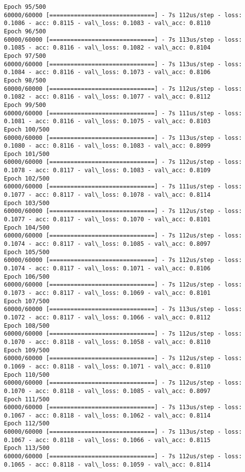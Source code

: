\documentclass[11pt]{article}
\begin{document}
\begin{Verbatim}[commandchars=\\\{\}]
Epoch 95/500
60000/60000 [==============================] - 7s 112us/step - loss: 0.1086 - acc: 0.8115 - val\_loss: 0.1083 - val\_acc: 0.8110
Epoch 96/500
60000/60000 [==============================] - 7s 113us/step - loss: 0.1085 - acc: 0.8116 - val\_loss: 0.1082 - val\_acc: 0.8104
Epoch 97/500
60000/60000 [==============================] - 7s 113us/step - loss: 0.1084 - acc: 0.8116 - val\_loss: 0.1073 - val\_acc: 0.8106
Epoch 98/500
60000/60000 [==============================] - 7s 112us/step - loss: 0.1082 - acc: 0.8116 - val\_loss: 0.1077 - val\_acc: 0.8112
Epoch 99/500
60000/60000 [==============================] - 7s 111us/step - loss: 0.1081 - acc: 0.8116 - val\_loss: 0.1075 - val\_acc: 0.8103
Epoch 100/500
60000/60000 [==============================] - 7s 113us/step - loss: 0.1080 - acc: 0.8116 - val\_loss: 0.1083 - val\_acc: 0.8099
Epoch 101/500
60000/60000 [==============================] - 7s 112us/step - loss: 0.1078 - acc: 0.8117 - val\_loss: 0.1083 - val\_acc: 0.8109
Epoch 102/500
60000/60000 [==============================] - 7s 111us/step - loss: 0.1077 - acc: 0.8117 - val\_loss: 0.1078 - val\_acc: 0.8114
Epoch 103/500
60000/60000 [==============================] - 7s 112us/step - loss: 0.1077 - acc: 0.8117 - val\_loss: 0.1070 - val\_acc: 0.8101
Epoch 104/500
60000/60000 [==============================] - 7s 112us/step - loss: 0.1074 - acc: 0.8117 - val\_loss: 0.1085 - val\_acc: 0.8097
Epoch 105/500
60000/60000 [==============================] - 7s 112us/step - loss: 0.1074 - acc: 0.8117 - val\_loss: 0.1071 - val\_acc: 0.8106
Epoch 106/500
60000/60000 [==============================] - 7s 112us/step - loss: 0.1073 - acc: 0.8117 - val\_loss: 0.1069 - val\_acc: 0.8101
Epoch 107/500
60000/60000 [==============================] - 7s 113us/step - loss: 0.1072 - acc: 0.8117 - val\_loss: 0.1066 - val\_acc: 0.8112
Epoch 108/500
60000/60000 [==============================] - 7s 112us/step - loss: 0.1070 - acc: 0.8118 - val\_loss: 0.1058 - val\_acc: 0.8110
Epoch 109/500
60000/60000 [==============================] - 7s 112us/step - loss: 0.1069 - acc: 0.8118 - val\_loss: 0.1071 - val\_acc: 0.8110
Epoch 110/500
60000/60000 [==============================] - 7s 112us/step - loss: 0.1070 - acc: 0.8118 - val\_loss: 0.1085 - val\_acc: 0.8097
Epoch 111/500
60000/60000 [==============================] - 7s 113us/step - loss: 0.1067 - acc: 0.8118 - val\_loss: 0.1062 - val\_acc: 0.8114
Epoch 112/500
60000/60000 [==============================] - 7s 113us/step - loss: 0.1067 - acc: 0.8118 - val\_loss: 0.1066 - val\_acc: 0.8115
Epoch 113/500
60000/60000 [==============================] - 7s 112us/step - loss: 0.1065 - acc: 0.8118 - val\_loss: 0.1059 - val\_acc: 0.8114

\end{Verbatim}
\end{document}
